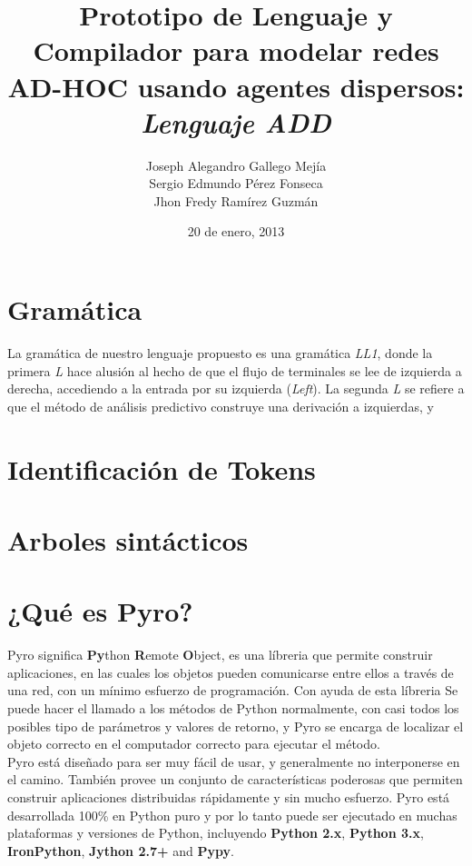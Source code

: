 \documentclass{article}
\begin{document}
\title{Prototipo de Lenguaje y Compilador para modelar redes AD-HOC usando agentes dispersos: \textit{Lenguaje ADD}}
\author{Joseph Alegandro Gallego Mejía\\
Sergio Edmundo Pérez Fonseca\\
Jhon Fredy Ramírez Guzmán}
\date{20 de enero, 2013}
\maketitle

\section{Gramática}
La gramática de nuestro lenguaje propuesto es una gramática \textit{LL1}, donde la primera \textit{L} hace alusión al hecho de que el flujo de terminales se lee de izquierda a derecha, accediendo a la entrada por su izquierda (\textit{Left}). La segunda \textit{L} se refiere a que el método de análisis predictivo construye una derivación a izquierdas, y 
\section{Identificación de Tokens}
\section{Arboles sintácticos}

\section{¿Qué es Pyro?}
Pyro significa \textbf{Py}thon \textbf{R}emote \textbf{O}bject, es una líbreria que permite construir aplicaciones, en las cuales los objetos pueden comunicarse entre ellos a través de una red, con un mínimo esfuerzo de programación. Con ayuda de esta líbreria Se puede hacer el llamado a los métodos de Python normalmente, con casi todos los posibles tipo de parámetros y valores de retorno, y Pyro se encarga de localizar el objeto correcto en el computador correcto para ejecutar el método.\\

Pyro está diseñado para ser muy fácil de usar, y generalmente no interponerse en el camino. También provee un conjunto de características poderosas que permiten construir aplicaciones distribuidas rápidamente y sin mucho esfuerzo. Pyro está desarrollada 100\% en Python puro y por lo tanto puede ser ejecutado en muchas plataformas y versiones de Python, incluyendo \textbf{Python 2.x}, \textbf{Python 3.x}, \textbf{IronPython}, \textbf{Jython 2.7+} and \textbf{Pypy}.\\
\end{document}
